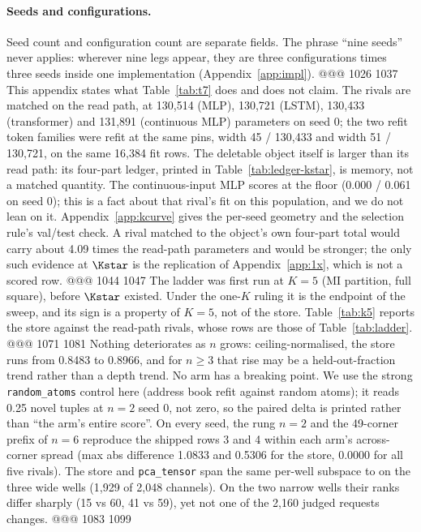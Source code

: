 \paragraph{Seeds and configurations.} Seed count and configuration count are separate fields. The
phrase ``nine seeds'' never applies: wherever nine legs appear, they are three configurations
times three seeds inside one implementation (Appendix~\ref{app:impl}).
@@@ 1026 1037
This appendix states what Table~\ref{tab:t7} does and does not claim. The rivals are matched on
the read path, at 130,514 (MLP), 130,721 (LSTM), 130,433 (transformer) and 131,891 (continuous MLP)
parameters on seed 0; the two refit token families were refit at the same pins, width 45 / 130,433 and
width 51 / 130,721, on the same 16,384 fit rows. %
The deletable object itself is larger than its read path: its four-part ledger, printed in
Table~\ref{tab:ledger-kstar}, is memory, not a matched quantity. The continuous-input MLP
scores at the floor (0.000 / 0.061 on seed 0); this is a fact about that rival's fit on this
population, and we do not lean on it. %
Appendix~\ref{app:kcurve} gives the per-seed geometry and the selection rule's val/test check.
A rival matched to the object's own four-part total would carry about 4.09 times the
read-path parameters and would be stronger; the only such evidence at $\Kstar$ is the
replication of Appendix~\ref{app:1x}, which is not a scored row. %
@@@ 1044 1047
The ladder was first run at $K=5$ (MI partition, full square), before $\Kstar$ existed. Under
the one-$K$ ruling it is the endpoint of the sweep, and its sign is a property of $K=5$, not of
the store. Table~\ref{tab:k5} reports the store against the read-path rivals, whose rows are
those of Table~\ref{tab:ladder}.
@@@ 1071 1081
\noindent Nothing deteriorates as $n$ grows: ceiling-normalised, the store runs from 0.8483 to
0.8966, and for $n\ge3$ that rise may be a held-out-fraction trend rather than a depth trend. No
arm has a breaking point. We use the strong \texttt{random\_atoms} control here (address book
refit against random atoms); it reads 0.25 novel tuples at $n=2$ seed 0, not zero, so the paired
delta is printed rather than ``the arm's entire score''. %
On every seed, the rung $n=2$ and the 49-corner prefix of $n=6$ reproduce the shipped rows 3 and
4 within each arm's across-corner spread (max abs difference 1.0833 and 0.5306 for the store,
0.0000 for all five rivals). %
The store and \texttt{pca\_tensor} span the same per-well subspace to  on the three
wide wells (1,929 of 2,048 channels). On the two narrow wells their ranks differ sharply (15 vs 60,
41 vs 59), yet not one of the 2,160 judged requests changes. %
@@@ 1083 1099
